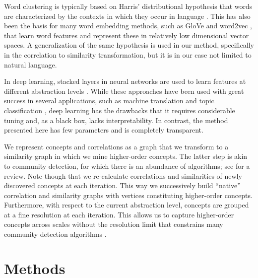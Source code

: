 \documentclass[conference]{IEEEtran}
\newcommand{\inquotes}[1]{``#1''}
\begin{document}
Word clustering is typically based on Harris' distributional hypothesis that words are characterized by the contexts in which they occur in language \cite{Harris54}.
This has also been the basis for many word embedding methods, such as GloVe \cite{Pennington2014} and word2vec \cite{Mikolov-2013},
 that learn word features and represent these in relatively low dimensional vector spaces. A generalization of the same hypothesis is used in our method, 
 specifically in the correlation to similarity transformation, but it is in our case not limited to natural language. 

In deep learning, stacked layers in neural networks are used to learn features at different abstraction levels \cite{LeCun15, Hinton06}. 
While these approaches have been used with great success in several applications, 
such as machine translation \cite{Jean15} and topic classification \cite{Bordes14}, 
deep learning has the drawbacks that it requires considerable tuning and, as a black box, lacks interpretability. 
In contrast, the method presented here has few parameters and is completely transparent.

We represent concepts and correlations as a graph that we transform to a similarity graph in which we mine higher-order concepts.
The latter step is akin to community detection, for which there is an abundance of algorithms; see \cite{Fortunato2010} for a review.
Note though that we re-calculate correlations and similarities of newly discovered concepts at each iteration. 
This way we successively build \inquotes{native} correlation and similarity graphs with vertices constituting higher-order concepts. 
Furthermore, with respect to the current abstraction level, concepts are grouped at a fine resolution at each iteration. This allows us 
to capture higher-order concepts across scales without the resolution limit that constrains many community detection algorithms \cite{Fortunato07}.

\section{Methods}
\label{sec:methods}
\end{document}
